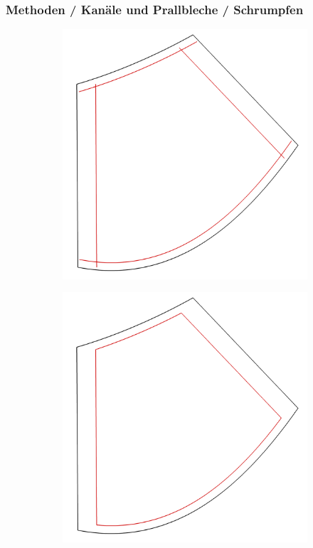 \documentclass[8pt, aspectratio=169]{beamer}
\begin{document}
\begin{frame}
	\frametitle{Methoden / Kanäle und Prallbleche / Schrumpfen}
	\hspace{-0.5cm}
	\begin{minipage}{\textwidth}
		\begin{figure}[H]
			\centering
			\begin{subfigure}{.3\textwidth}
				\includegraphics[width=\textwidth]{../tec/chambers/11.png}
			\end{subfigure}
			\begin{subfigure}{.3\textwidth}
				\includegraphics[width=\textwidth]{../tec/chambers/12.png}

\end{subfigure}
\end{figure}
\end{minipage}
\end{frame}
\end{document}
